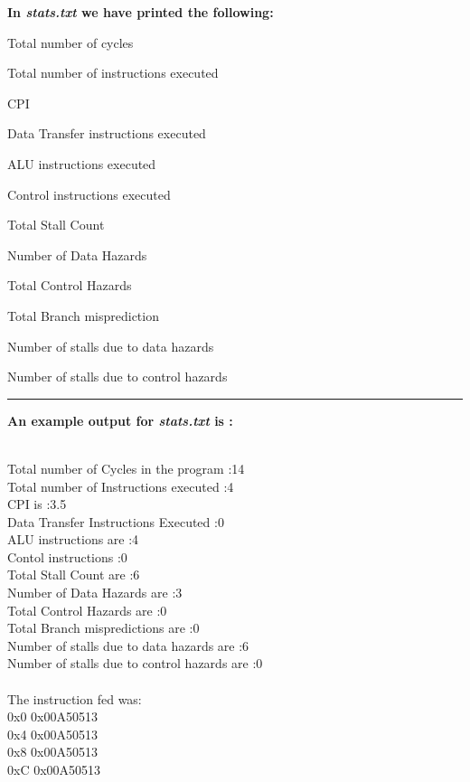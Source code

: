 \documentclass{article}
\begin{document}
\newpage
\textbf{In \textsl{stats.txt} we have printed the following:}

\begin{enumerate}
\begin{LARGE}
\item \textsf{Total number of cycles}
\item \textsf{Total number of instructions executed}
\item \textsf{CPI}
\item \textsf{Data Transfer instructions executed}
\item \textsf{ALU instructions executed}
\item \textsf{Control instructions executed}
\item \textsf{Total Stall Count}
\item \textsf{Number of Data Hazards}
\item \textsf{Total Control Hazards}
\item \textsf{Total Branch misprediction}
\item \textsf{Number of stalls due to data hazards}
\item \textsf{Number of stalls due to control hazards}
\end{LARGE}
\end{enumerate}

\par\noindent\rule{\textwidth}{0.4pt}



\noindent
\textbf{An example output for \textsl{stats.txt} is :}\\
\\
\begin{LARGE}
\textsf{Total number of Cycles in the program :14}\\
\textsf{Total number of Instructions executed :4}\\
\textsf{CPI is :3.5}\\
\textsf{Data Transfer Instructions Executed :0}\\
\textsf{ALU instructions are :4}\\
\textsf{Contol instructions :0}\\
\textsf{Total Stall Count are :6}\\
\textsf{Number of Data Hazards are :3}\\
\textsf{Total Control Hazards are :0}\\
\textsf{Total Branch mispredictions are :0}\\
\textsf{Number of stalls due to data hazards are :6}\\
\textsf{Number of stalls due to control hazards are :0}\\\\
\textsf{The instruction fed was:}\\
\textsf{0x0	0x00A50513}\\
\textsf{0x4	0x00A50513}\\
\textsf{0x8	0x00A50513}\\
\textsf{0xC	0x00A50513}\\
\end{LARGE}
\vspace{0.6cm}
\end{document}
